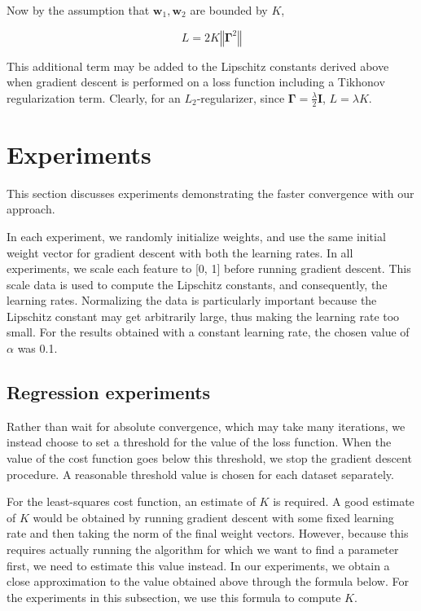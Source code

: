 \documentclass{article}
\begin{document}
Now by the assumption that $\textbf{w}_1, \textbf{w}_2$ are bounded by $K$, 

\[
    \boxed{
        L = 2K \left\Vert \boldsymbol\Gamma^2 \right\Vert
    }
\]

This additional term may be added to the Lipschitz constants derived above when gradient descent is performed on a loss function including a Tikhonov regularization term. Clearly, for an $L_2$-regularizer, since $\boldsymbol\Gamma = \frac{\lambda}{2}\textbf{I}$, $L = \lambda K$.

\section{Experiments}
This section discusses experiments demonstrating the faster convergence with our approach. 

In each experiment, we randomly initialize weights, and use the same initial weight vector for gradient descent with both the learning rates. In all experiments, we scale each feature to [0, 1] before running gradient descent. This scale data is used to compute the Lipschitz constants, and consequently, the learning rates. Normalizing the data is particularly important because the Lipschitz constant may get arbitrarily large, thus making the learning rate too small. For the results obtained with a constant learning rate, the chosen value of $\alpha$ was 0.1.

\subsection{Regression experiments}
Rather than wait for absolute convergence, which may take many iterations, we instead choose to set a threshold for the value of the loss function. When the value of the cost function goes below this threshold, we stop the gradient descent procedure. A reasonable threshold value is chosen for each dataset separately.

For the least-squares cost function, an estimate of $K$ is required. A good estimate of $K$ would be obtained by running gradient descent with some fixed learning rate and then taking the norm of the final weight vectors. However, because this requires actually running the algorithm for which we want to find a parameter first, we need to estimate this value instead. In our experiments, we obtain a close approximation to the value obtained above through the formula below. For the experiments in this subsection, we use this formula to compute $K$.
\end{document}
